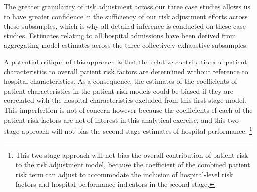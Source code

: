 \documentclass[submission]{grattan}
\begin{document}
The greater granularity of risk adjustment across our three case studies allows us to have greater confidence in the sufficiency of our risk adjustment efforts across these subsamples, which is why all detailed inference is conducted on these case studies.
Estimates relating to all hospital admissions have been derived from aggregating model estimates across the three collectively exhaustive subsamples.

A potential critique of this approach is that the relative contributions of patient characteristics to overall patient risk factors are determined without reference to hospital characteristics.
As a consequence, the estimates of the coefficients of patient characteristics in the patient risk models could be biased if they are correlated with the hospital characteristics excluded from this first-stage model.
This imperfection is not of concern however because the coefficients of each of the patient risk factors are not
of interest in this analytical exercise, and this two-stage approach will not bias the second stage estimates of hospital performance.%
	\footnote{This two-stage approach will not bias the overall contribution of patient risk to the risk adjustment model, because the coefficient of the combined patient risk term can adjust to accommodate the inclusion of hospital-level risk factors and hospital performance indicators in the second stage.}
\end{document}
